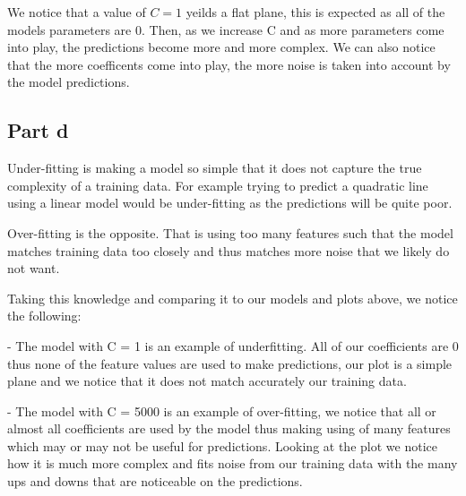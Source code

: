 \documentclass[10pt]{article}
\begin{document}
\begin{figure}[H]
\end{figure}

We notice that a value of $C = 1$ yeilds a flat plane, this is expected as all of the
models parameters are 0. Then, as we increase C and as more parameters come into play,
the predictions become more and more complex. We can also notice that the more
coefficents come into play, the more noise is taken into account by the model
predictions.


\subsection*{Part d}
Under-fitting is making a model so simple that it does not capture the
true complexity of a training data. For example trying to predict a
quadratic line using a linear model would be under-fitting as the predictions will
be quite poor.

Over-fitting is the opposite. That is using too many features such that the model
matches training data too closely and thus matches more noise that we likely do not want.

Taking this knowledge and comparing it to our models and plots above, we notice the following:

- The model with C = 1 is an example of underfitting. All of our coefficients are 0 thus
none of the feature values are used to make predictions, our plot is a simple plane 
and we notice that it does not match accurately our training data.

- The model with C = 5000 is an example of over-fitting, we notice that all or almost all 
coefficients are used by the model thus making using of many features which may 
or may not be useful for predictions. Looking at the plot we notice how it is much more complex
and fits noise from our training data with the many ups and downs that are noticeable on the predictions.
\end{document}

